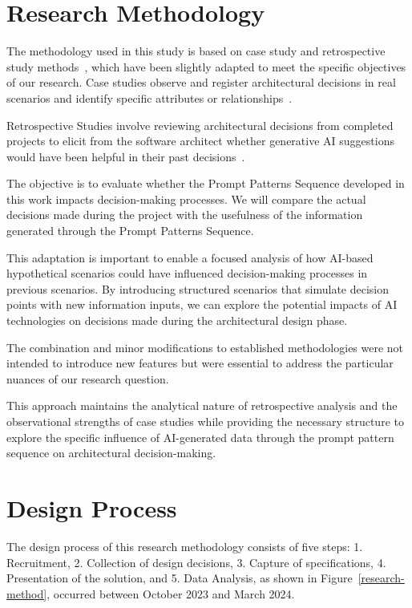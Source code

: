 \section{Research Methodology}

The methodology used in this study is based on case study and retrospective study methods~\cite{desouza2005experiences,runeson2012case}, which have been slightly adapted to meet the specific objectives of our research. Case studies observe and register architectural decisions in real scenarios and identify specific attributes or relationships~\cite{gustafsson2017single}. 

Retrospective Studies involve reviewing architectural decisions from completed projects to elicit from the software architect whether generative AI suggestions would have been helpful in their past decisions~\cite{hayes2011impact}. 

The objective is to evaluate whether the Prompt Patterns Sequence developed in this work impacts decision-making processes. We will compare the actual decisions made during the project with the usefulness of the information generated through the Prompt Patterns Sequence.

This adaptation is important to enable a focused analysis of how AI-based hypothetical scenarios could have influenced decision-making processes in previous scenarios. By introducing structured scenarios that simulate decision points with new information inputs, we can explore the potential impacts of AI technologies on decisions made during the architectural design phase. 

The combination and minor modifications to established methodologies were not intended to introduce new features but were essential to address the particular nuances of our research question. 

This approach maintains the analytical nature of retrospective analysis and the observational strengths of case studies while providing the necessary structure to explore the specific influence of AI-generated data through the prompt pattern sequence on architectural decision-making.


\section{Design Process}
The design process of this research methodology consists of five steps: 1. Recruitment, 2. Collection of design decisions, 3. Capture of specifications, 4. Presentation of the solution, and 5. Data Analysis, as shown in Figure~\ref{research-method}, occurred between October 2023 and March 2024.

